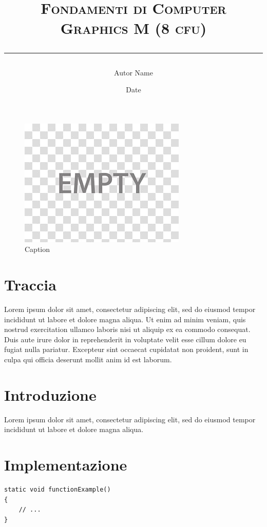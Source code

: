\documentclass[11pt]{article}
\title{\textsc{Fondamenti di Computer Graphics M (8 cfu)} \\[\subtitlelinesep] \smaller[\subtitlerelsize]{\textcolor{gray}{\textsc{Lab N - Title}}} 
\vspace{10pt}\hrule\vspace{10pt}}
\author{Autor Name}
\date{Date}
\begin{document}
\maketitle

\begin{figure}[H]
    \centering
    \includegraphics[width=1.\columnwidth]{gfx/Thumbnail.jpg}
    \caption{Caption}
    \label{fig:thumbnail.png}
\end{figure}

\section*{Traccia}
Lorem ipsum dolor sit amet, consectetur adipiscing elit, sed do eiusmod tempor incididunt ut labore et dolore magna aliqua. Ut enim ad minim veniam, quis nostrud exercitation ullamco laboris nisi ut aliquip ex ea commodo consequat. Duis aute irure dolor in reprehenderit in voluptate velit esse cillum dolore eu fugiat nulla pariatur. Excepteur sint occaecat cupidatat non proident, sunt in culpa qui officia deserunt mollit anim id est laborum.

\section{Introduzione}
Lorem ipsum dolor sit amet, consectetur adipiscing elit, sed do eiusmod tempor incididunt ut labore et dolore magna aliqua. 

\section{Implementazione}
\begin{verbatim}
static void functionExample()
{
    // ...
}
\end{verbatim}
\end{document}
